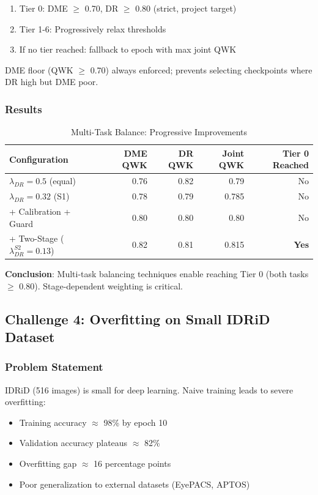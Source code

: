 \documentclass[12pt,a4paper]{article}
\begin{document}
\begin{enumerate}
    \item Tier 0: DME $\geq$ 0.70, DR $\geq$ 0.80 (strict, project target)
    \item Tier 1-6: Progressively relax thresholds
    \item If no tier reached: fallback to epoch with max joint QWK
\end{enumerate}

DME floor (QWK $\geq$ 0.70) always enforced; prevents selecting checkpoints where DR high but DME poor.

\subsubsection{Results}

\begin{table}[H]
\centering
\small
\caption{Multi-Task Balance: Progressive Improvements}
\begin{tabular}{|l|r|r|r|r|}
\hline
\textbf{Configuration} & \textbf{DME QWK} & \textbf{DR QWK} & \textbf{Joint QWK} & \textbf{Tier 0 Reached} \\
\hline
$\lambda_{DR}=0.5$ (equal) & 0.76 & 0.82 & 0.79 & No \\
$\lambda_{DR}=0.32$ (S1) & 0.78 & 0.79 & 0.785 & No \\
+ Calibration + Guard & 0.80 & 0.80 & 0.80 & No \\
+ Two-Stage ($\lambda_{DR}^{S2}=0.13$) & 0.82 & 0.81 & 0.815 & \textbf{Yes} \\
\hline
\end{tabular}
\end{table}

\textbf{Conclusion}: Multi-task balancing techniques enable reaching Tier 0 (both tasks $\geq$ 0.80). Stage-dependent weighting is critical.

\subsection{Challenge 4: Overfitting on Small IDRiD Dataset}

\subsubsection{Problem Statement}

IDRiD (516 images) is small for deep learning. Naive training leads to severe overfitting:

\begin{itemize}
    \item Training accuracy $\approx$ 98\% by epoch 10
    \item Validation accuracy plateaus $\approx$ 82\%
    \item Overfitting gap $\approx$ 16 percentage points
    \item Poor generalization to external datasets (EyePACS, APTOS)
\end{itemize}
\end{document}
